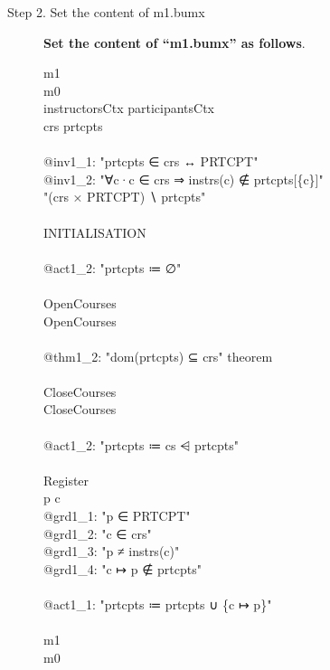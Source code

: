 \begin{description}
\item[Step 2. Set the content of m1.bumx] \textbf{Set the content of ``m1.bumx'' as follows}.
  \begin{center}
    \begin{Bcode}
      \ifplastex
      \Bmachine{} m1\\
      \Brefines{} m0\\
      \Bsees{} instructorsCtx participantsCtx \\
      \Bvariables{} crs prtcpts \\
      \Binvariants\\
      @inv1_1: "prtcpts ∈ crs ↔ PRTCPT"\\
      @inv1_2: "∀c·c ∈ crs ⇒ instrs(c) ∉ prtcpts[\{c\}]"\\
      \Bvariant{} "(crs × PRTCPT) ∖ prtcpts"\\
      \Bevents\\
      INITIALISATION \Bextended\\
      \Bbegin\\
      @act1_2: "prtcpts ≔ ∅"\\
      \Bend\\
      OpenCourses \Bextended\\
      \Brefines{} OpenCourses\\
      \Bwhen\\
      @thm1_2: "dom(prtcpts) ⊆ crs" theorem \\
      \Bend\\
      CloseCourses \Bextended{} \Banticipated\\
      \Brefines{} CloseCourses\\
      \Bbegin\\
      @act1_2: "prtcpts ≔ cs ⩤ prtcpts"\\
      \Bend\\
      Register \Bconvergent\\
      \Bany{} p c \Bwhere \\
      @grd1_1: "p ∈ PRTCPT"\\
      @grd1_2: "c ∈ crs"\\
      @grd1_3: "p ≠ instrs(c)"\\
      @grd1_4: "c ↦ p ∉ prtcpts"\\
      \Bthen\\
      @act1_1: "prtcpts ≔ prtcpts ∪ \{c ↦ p\}"\\
      \Bend\\
      \Bend
      \else
      \Bmachine{} m1\\
      \Brefines{} m0\\

\end{Bcode}
\end{center}
\end{description}
